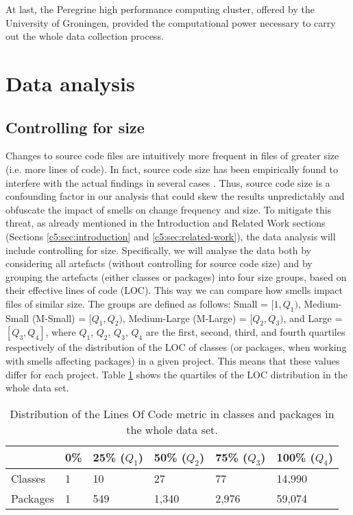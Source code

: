 At last, the Peregrine high performance computing cluster, offered by the University of Groningen, provided the computational power necessary to carry out the whole data collection process.

\section{Data analysis}\label{c5:sec:data-analysis}
\subsection{Controlling for size}\label{c5:sec:data-analysis-size}
Changes to source code files are intuitively more frequent in files of greater size (i.e. more lines of code). In fact, source code size has been empirically found to interfere with the actual findings in several cases \cite{ElEmam2001,Zhou2009}. Thus, source code size is a confounding factor in our analysis that could skew the results unpredictably and obfuscate the impact of smells on change frequency and size.
To mitigate this threat, as already mentioned in the Introduction and Related Work sections (Sections \ref{c5:sec:introduction} and \ref{c5:sec:related-work}), the data analysis will include controlling for size. Specifically, we will analyse the data both by considering all artefacts (without controlling for source code size) and by grouping the artefacts (either classes or packages) into four size groups, based on their effective lines of code (LOC). This way we can compare how smells impact files of similar size.
The groups are defined as follows: Small = $[1, Q_1)$, Medium-Small (M-Small) = $[Q_1, Q_2)$, Medium-Large (M-Large) = $[Q_2, Q_3)$, and Large = $[Q_3, Q_4]$, where $Q_1$, $Q_2$, $Q_3$, $Q_4$ are the first, second, third, and fourth quartiles respectively of the distribution of the LOC of classes (or packages, when working with smells affecting packages) in a given project. This means that these values differ for each project. Table \ref{c5:tab:quartiles-loc} shows the quartiles of the LOC distribution in the whole data set.


\begin{table}[]
    \caption{Distribution of the Lines Of Code metric in classes and packages in the whole data set.}
    \centering
    \label{c5:tab:quartiles-loc}
    \begin{tabular}{@{}llllll@{}}
    \toprule
            & \textbf{0\%} & \textbf{25\% ($Q_1$)} & \textbf{50\% ($Q_2$)} & \textbf{75\% ($Q_3$)} & \textbf{100\% ($Q_4$)} \\ \midrule
    Classes   & 1   & 10        & 27        & 77        & 14,990 \\
    Packages & 1   & 549       & 1,340      & 2,976      & 59,074 \\ \bottomrule
    \end{tabular}
\end{table}

